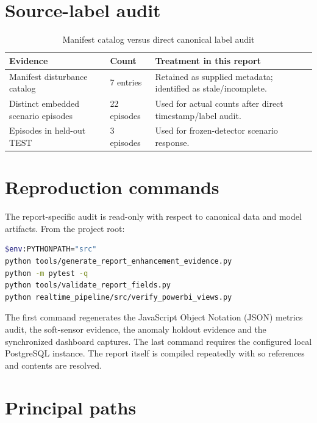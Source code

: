 \section{Source-label audit}

\begin{table}[htbp]
\centering\small
\caption{Manifest catalog versus direct canonical label audit}
\label{tab:manifest-audit}
\begin{tabularx}{\textwidth}{@{}p{}p{}Y@{}}
\toprule
Evidence & Count & Treatment in this report \\
\midrule
Manifest disturbance catalog & 7 entries & Retained as supplied metadata; identified as stale/incomplete. \\
Distinct embedded scenario episodes & 22 episodes & Used for actual counts after direct timestamp/label audit. \\
Episodes in held-out TEST & 3 episodes & Used for frozen-detector scenario response. \\
\bottomrule
\end{tabularx}
\end{table}

\section{Reproduction commands}

The report-specific audit is read-only with respect to canonical data and model artifacts. From the project root:

\begin{lstlisting}[language=bash]
$env:PYTHONPATH="src"
python tools/generate_report_enhancement_evidence.py
python -m pytest -q
python tools/validate_report_fields.py
python realtime_pipeline/src/verify_powerbi_views.py
\end{lstlisting}

The first command regenerates the JavaScript Object Notation (JSON) metrics audit, the soft-sensor evidence, the anomaly holdout evidence and the synchronized dashboard captures. The last command requires the configured local PostgreSQL instance. The report itself is compiled repeatedly with  so references and contents are resolved.

\section{Principal paths}

